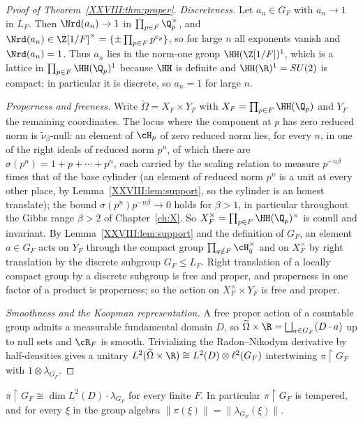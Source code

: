 \begin{proof}[Proof of Theorem~\ref{XXVIII:thm:proper}]
\emph{Discreteness.} Let $a_n\in G_F$ with $a_n\to1$ in $L_F$. Then $\Nrd(a_n)\to1$ in
$\prod_{p\in F}\Q_p^\times$, and $\Nrd(a_n)\in\Z[1/F]^\times=\{\pm\prod_{p\in F}p^{e_p}\}$, so for
large $n$ all exponents vanish and $\Nrd(a_n)=1$. Thus $a_n$ lies in the norm-one group
$\HH(\Z[1/F])^1$, which is a lattice in $\prod_{p\in F}\HH(\Q_p)^1$ because $\HH$ is definite and
$\HH(\R)^1=SU(2)$ is compact; in particular it is discrete, so $a_n=1$ for large $n$.

\emph{Properness and freeness.} Write $\widetilde\Omega=X_F\times Y_F$ with
$X_F=\prod_{p\in F}\HH(\Q_p)$ and $Y_F$ the remaining coordinates. The locus where the component at $p$
has zero reduced norm is $\widetilde\nu_\beta$-null: an element of $\cH_p$ of zero reduced
norm lies, for every $n$, in one of the right ideals of reduced norm $p^n$, of which there
are $\sigma(p^n)=1+p+\cdots+p^n$, each carried by the scaling relation to measure
$p^{-n\beta}$ times that of the base cylinder (an element of reduced norm $p^n$ is a unit at
every other place, by Lemma~\ref{XXVIII:lem:support}, so the cylinder is an honest translate); the
bound $\sigma(p^n)p^{-n\beta}\to0$ holds for $\beta>1$, in particular throughout the Gibbs
range $\beta>2$ of Chapter~\ref{ch:X}. So $X_F^\times=\prod_{p\in F}\HH(\Q_p)^\times$ is conull and invariant.
By Lemma~\ref{XXVIII:lem:support} and the definition of $G_F$, an element $a\in G_F$ acts on $Y_F$ through
the compact group $\prod_{q\notin F}\cH_q^\times$ and on $X_F^\times$ by right translation by the
discrete subgroup $G_F\le L_F$. Right translation of a locally compact group by a discrete subgroup
is free and proper, and properness in one factor of a product is properness; so the action on
$X_F^\times\times Y_F$ is free and proper.

\emph{Smoothness and the Koopman representation.} A free proper action of a countable group admits
a measurable fundamental domain $D$, so $\widetilde\Omega\times\R=\bigsqcup_{a\in G_F}(D\cdot a)$
up to null sets and $\cR_F$ is smooth. Trivializing the Radon--Nikodym derivative by half-densities
gives a unitary
$L^2(\widetilde\Omega\times\R)\cong L^2(D)\otimes\ell^2(G_F)$ intertwining $\pi\restriction G_F$
with $1\otimes\lambda_{G_F}$.
\end{proof}

\begin{corollary}\label{XXVIII:cor:regular}
$\pi\restriction G_F\cong\dim L^2(D)\cdot\lambda_{G_F}$ for every finite $F$. In particular
$\pi\restriction G_F$ is tempered, and for every $\xi$ in the group algebra
$\|\pi(\xi)\|=\|\lambda_{G_F}(\xi)\|$.
\end{corollary}

